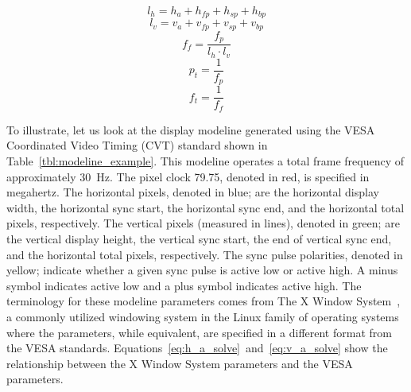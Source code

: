     \begin{equation}
        l_h=h_a+h_{fp}+h_{sp}+h_{bp}
        \label{eq:l_h}
    \end{equation}
    \begin{equation}
        l_v=v_a+v_{fp}+v_{sp}+v_{bp}
        \label{eq:l_v}
    \end{equation}
    \begin{equation}
        f_f={\frac{f_p}{l_h \cdot l_v}}
        \label{eq:f_f}
    \end{equation}
    \begin{equation}
        p_t={\frac{1}{f_p}}
        \label{eq:p_t}
    \end{equation}
    \begin{equation}
        f_t={\frac{1}{f_f}}
        \label{eq:f_t}
    \end{equation}

    To illustrate, let us look at the display modeline generated using the VESA Coordinated Video Timing (CVT) standard shown in Table~\ref{tbl:modeline_example}. This modeline operates a total frame frequency of approximately \mbox{30 Hz}. The pixel clock 79.75, denoted in red, is specified in megahertz. The horizontal pixels, denoted in blue; are the horizontal display width, the horizontal sync start, the horizontal sync end, and the horizontal total pixels, respectively. The vertical pixels (measured in lines), denoted in green; are the vertical display height, the vertical sync start, the end of vertical sync end, and the horizontal total pixels, respectively. The sync pulse polarities, denoted in yellow; indicate whether a given sync pulse is active low or active high. A minus symbol indicates active low and a plus symbol indicates active high. The terminology for these modeline parameters comes from The X Window System~\cite{TheOpenGroup2020}, a commonly utilized windowing system in the Linux family of operating systems where the parameters, while equivalent, are specified in a different format from the VESA standards. Equations~\eqref{eq:h_a_solve}~and~\eqref{eq:v_a_solve} show the relationship between the X Window System parameters and the VESA parameters.

